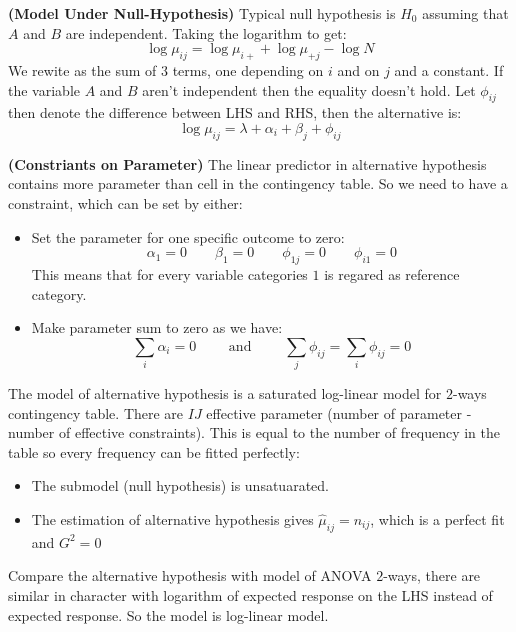 \begin{remark}{\textbf{(Model Under Null-Hypothesis)}}
    Typical null hypothesis is $H_0$ assuming that $A$ and $B$ are independent. Taking the logarithm to get:
    \begin{equation*}
        \log \mu_{ij} = \log \mu_{i+} + \log \mu_{+j} - \log N
    \end{equation*}
    We rewite as the sum of $3$ terms, one depending on $i$ and on $j$ and a constant. If the variable $A$ and $B$ aren't independent then the equality doesn't hold. Let $\phi_{ij}$ then denote the difference between LHS and RHS, then the alternative is:
    \begin{equation*}
        \log \mu_{ij} = \lambda + \alpha_i + \beta_j + \phi_{ij}
    \end{equation*}
\end{remark}

\begin{remark}{\textbf{(Constriants on Parameter)}}
    The linear predictor in alternative hypothesis contains more parameter than cell in the contingency table. So we need to have a constraint, which can be set by either:
    \begin{itemize}
        \item Set the parameter for one specific outcome to zero:
        \begin{equation*}
            \alpha_1 = 0 \qquad \beta_1 = 0 \qquad \phi_{1j} = 0 \qquad \phi_{i1} = 0
        \end{equation*}
        This means that for every variable categories $1$ is regared as reference category. 
        \item Make parameter sum to zero as we have:
        \begin{equation*}
            \sum_i\alpha_i = 0 \qquad \text{ and } \qquad \sum_j\phi_{ij} = \sum_i\phi_{ij} = 0
        \end{equation*}
    \end{itemize}
    The model of alternative hypothesis is a saturated log-linear model for $2$-ways contingency table. There are $IJ$ effective parameter (number of parameter - number of effective constraints). This is equal to the number of frequency in the table so every frequency can be fitted perfectly:
    \begin{itemize}
        \item The submodel (null hypothesis) is unsatuarated. 
        \item The estimation of alternative hypothesis gives $\hat{\mu}_{ij} = n_{ij}$, which is a perfect fit and $G^2 = 0$
    \end{itemize}
    Compare the alternative hypothesis with model of ANOVA $2$-ways, there are similar in character with logarithm of expected response on the LHS instead of expected response. So the model is log-linear model. 
\end{remark}

